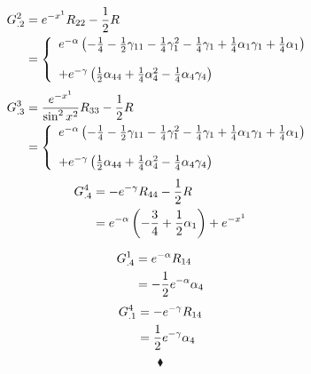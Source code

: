 \begin{align}
G^2_{.2} &= e^{-x^1}R_{22} - \frac{1}{2} R\\
 &= \left\{\begin{array}{l}e^{-\alpha}\left(-\frac{1}{4} - \frac{1}{2} \gamma_{11} - \frac{1}{4} \gamma_{1}^2 -\frac{1}{4} \gamma_{1} + \frac{1}{4}\alpha_1\gamma_1 + \frac{1}{4} \alpha_1\right)\\\\
 +e^{-\gamma}\left( \frac{1}{2} \alpha_{44} +\frac{1}{4} \alpha_{4}^2 - \frac{1}{4}\alpha_4\gamma_4 \right)
 \end{array}\right.
\end{align}
\begin{align}
G^3_{.3} &= \frac{e^{-x^1}}{\sin^2 x^2}R_{33} - \frac{1}{2} R\\
 &= \left\{\begin{array}{l}e^{-\alpha}\left(-\frac{1}{4} - \frac{1}{2} \gamma_{11} - \frac{1}{4} \gamma_{1}^2 -\frac{1}{4} \gamma_{1} + \frac{1}{4}\alpha_1\gamma_1 + \frac{1}{4} \alpha_1\right)\\\\
 +e^{-\gamma}\left( \frac{1}{2} \alpha_{44} +\frac{1}{4} \alpha_{4}^2 - \frac{1}{4}\alpha_4\gamma_4 \right)
 \end{array}\right.
\end{align}
\begin{align}
G^4_{.4} &= -e^{-\gamma}R_{44} - \frac{1}{2} R\\
 &= e^{-\alpha}\left(-\frac{3}{4} + \frac{1}{2} \alpha_1\right)+e^{-x^1}
\end{align}

\begin{align}
G^1_{.4} &= e^{-\alpha}R_{14}\\
 &= -\frac{1}{2} e^{-\alpha} \alpha_4
\end{align}
\begin{align}
G^4_{.1} &=- e^{-\gamma}R_{14}\\
 &= \frac{1}{2} e^{-\gamma} \alpha_4
\end{align}
$$\blacklozenge$$
\newpage

